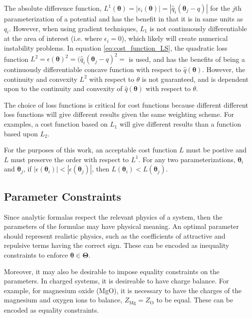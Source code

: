 The absolute difference function,  $L^1(\bm{\theta})=| \epsilon_i(\bm{\theta}) | = |\hat{q}_i(\bm{\theta}_j-q)|$ for the $j$th parameterization of a potential and has the benefit in that it is in same units as $q_i$.  However, when using gradient techniques, $L_1$ is not continuously differentiable at the area of interest (i.e. where $\epsilon_i =0$), which likely will create numerical instability problems.  In equation \ref{eq:cost_function_LS}, the quadratic loss function
$L^2
		=\epsilon(\bm{\theta})^2
		=(\hat{q}_i(\bm{\theta}_j-q)^2=$
is used, and has the benefits of being a continuously differentiable concave function with respect to $\hat{q}(\bm{\theta})$.  However, the continuity and convexity $L^2$ with respect to $\theta$ is not guaranteed, and is dependent upon to the continuity and convexity of $\hat{q}(\bm{\theta})$ with respect to $\theta$.

The choice of loss functions is critical for cost functions because different different loss functions will give different results given the same weighting scheme.  For examples, a cost function based on $L_1$ will give different results than a function based upon $L_2$.

For the purposes of this work, an acceptable cost function $L$ must be postive and $L$ must preserve the order with respect to $L^1$.  For any two parameterizations, $\bm{\theta}_i$ and $\bm{\theta}_j$, if $|\epsilon(\bm{\theta}_i)| < |\epsilon(\bm{\theta}_j)|$, then $L(\bm{\theta}_i) < L(\bm{\theta}_j)$.

\subsection{Parameter Constraints}

Since analytic formalas respect the relevant physics of a system, then the parameters of the formulae may have physical meaning.  An optimal parameter should represent realistic physics, such as the coefficients of attractive and repulsive terms having the correct sign.  These can be encoded as inequality constraints to enforce $\bm{\theta} \in \bm{\Theta}$.

Moreover, it may also be desirable to impose equality constraints on the parameters.  In charged systems, it is desireable to have charge balance.  For example, for magnesium oxide (MgO), it is necessary to have the charges of the magnesium and oxygen ions to balance, $Z_{\text{Mg}} = Z_{\text{O}}$ to be equal.  These can be encoded as equality constraints.

